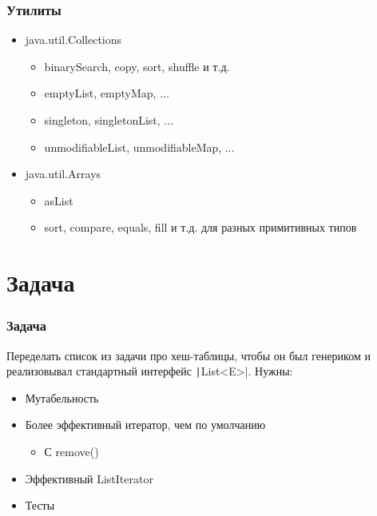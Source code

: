 \documentclass[xetex,mathserif,serif]{beamer}
\begin{document}
	\begin{frame}
		\frametitle{Утилиты}
		\begin{itemize}
			\item java.util.Collections
			\begin{itemize}
				\item binarySearch, copy, sort, shuffle и т.д.
				\item emptyList, emptyMap, ...
				\item singleton, singletonList, ...
				\item unmodifiableList, unmodifiableMap, ...
			\end{itemize}
			\item java.util.Arrays
			\begin{itemize}
				\item asList
				\item sort, compare, equals, fill и т.д. для разных примитивных типов
			\end{itemize}
		\end{itemize}
	\end{frame}

	\section{Задача}

	\begin{frame}
		\frametitle{Задача}
		Переделать список из задачи про хеш-таблицы, чтобы он был генериком и реализовывал стандартный интерфейс \texttt|List<E>|. Нужны:
		\begin{itemize}
			\item Мутабельность
			\item Более эффективный итератор, чем по умолчанию
			\begin{itemize}
				\item С remove()
			\end{itemize}
			\item Эффективный ListIterator
			\item Тесты
		\end{itemize}
	\end{frame}
\end{document}
